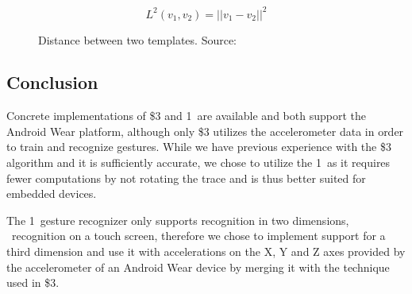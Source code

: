 \begin{figure}[h]
\[ L^{2}(v_1, v_2) = \lvert\lvert v_1 - v_2 \rvert\rvert^2 \]
\caption{Distance between two templates. Source:~\cite{herold20121}}
\label{eq:one-cent-l-squared}
\end{figure}

\subsection{Conclusion}

Concrete implementations of \$3 and 1\textcent~are available and both support the Android Wear platform, although only \$3 utilizes the accelerometer data in order to train and recognize gestures. While we have previous experience with the \$3 algorithm and it is sufficiently accurate, we chose to utilize the 1\textcent~as it requires fewer computations by not rotating the trace and is thus better suited for embedded devices.

The 1\textcent~gesture recognizer only supports recognition in two dimensions, \eg~recognition on a touch screen, therefore we chose to implement support for a third dimension and use it with accelerations on the X, Y and Z axes provided by the accelerometer of an Android Wear device by merging it with the technique used in \$3.

